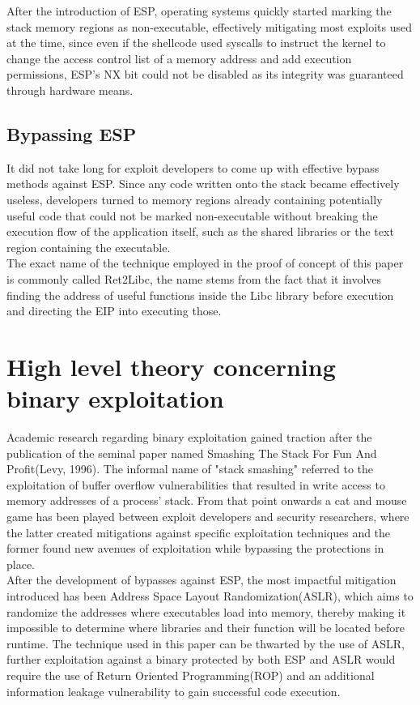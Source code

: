 \documentclass[a4paper,9pt]{report}
\begin{document}
After the introduction of ESP, operating systems quickly started marking the stack memory regions as non-executable, effectively mitigating most exploits used at the time, since even if the shellcode used syscalls to instruct the kernel to change the access control list of a memory address and add execution permissions, ESP's NX bit could not be disabled as its integrity was guaranteed through hardware means.\\


\section{Bypassing ESP}
\label{sec:org59d99ce}

It did not take long for exploit developers to come up with effective bypass methods against ESP. Since any code written onto the stack became effectively useless, developers turned to memory regions already containing potentially useful code that could not be marked non-executable without breaking the execution flow of the application itself, such as the shared libraries or the text region containing the executable.\\

The exact name of the technique employed in the proof of concept of this paper is commonly called Ret2Libc, the name stems from the fact that it involves finding the address of useful functions inside the Libc library before execution and directing the EIP into executing those.\\


\chapter{High level theory concerning binary exploitation}
\label{sec:org5c50768}

Academic research regarding binary exploitation gained traction after the publication of the seminal paper named Smashing The Stack For Fun And Profit(Levy, 1996). The informal name of "stack smashing" referred to the exploitation of buffer overflow vulnerabilities that resulted in write access to memory addresses of a process' stack. From that point onwards a cat and mouse game has been played between exploit developers and security researchers, where the latter created mitigations against specific exploitation techniques and the former found new avenues of exploitation while bypassing the protections in place.\\

After the development of bypasses against ESP, the most impactful mitigation introduced has been Address Space Layout Randomization(ASLR), which aims to randomize the addresses where executables load into memory, thereby making it impossible to determine where libraries and their function will be located before runtime. The technique used in this paper can be thwarted by the use of ASLR, further exploitation against a binary protected by both ESP and ASLR would require the use of Return Oriented Programming(ROP) and an additional information leakage vulnerability to gain successful code execution.\\
\end{document}
